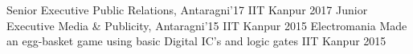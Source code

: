  \begin{cvhonors}
     \cvhonor
     {Senior Executive}
     {Public Relations, Antaragni'17}
     {IIT Kanpur}
     {2017}
     \cvhonor
     {Junior Executive}
     {Media \& Publicity, Antaragni'15}
     {IIT Kanpur}
     {2015}
     \cvhonor
     {Electromania}
     {Made an egg-basket game using basic Digital IC’s and logic gates}
     {IIT Kanpur}
     {2015}
 \end{cvhonors}




